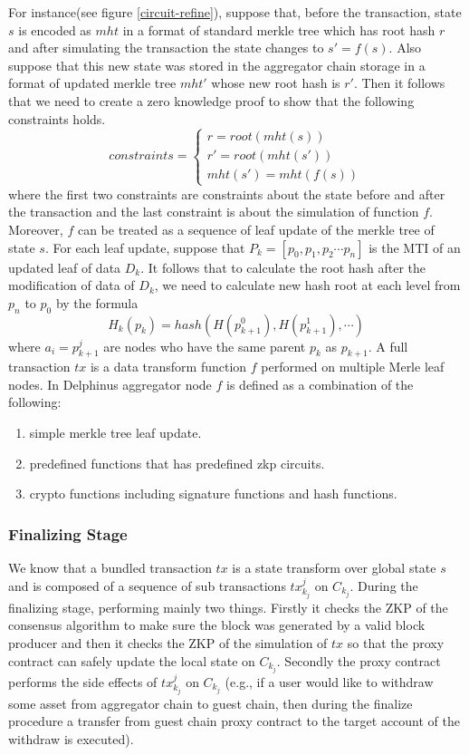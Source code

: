 \documentclass[acmtog, natbib=false]{acmart}
\begin{document}
For instance(see figure \ref{circuit-refine}), suppose that, before the transaction, state $s$ is encoded as $mht$ in a format of standard merkle tree which has root hash $r$ and after simulating the transaction the state changes to $s' = f(s)$. Also suppose that this new state was stored in the aggregator chain storage in a format of updated merkle tree $mht'$ whose new root hash is $r'$.
Then it follows that we need to create a zero knowledge proof to show that the following constraints holds.
$$ constraints = \begin{cases}
    r = root(mht(s)) \\
    r' = root(mht(s'))\\
    mht(s') = mht(f(s))
\end{cases} $$
where the first two constraints are constraints about the state before and after the transaction and the last constraint is about the simulation of function $f$.\\
\newline
Moreover, $f$ can be treated as a sequence of leaf update of the merkle tree of state $s$. For each leaf update, suppose that $P_k = [p_0, p_1, p_2 \cdots p_n]$ is the MTI of an updated leaf of data $D_k$. It follows that to calculate the root hash after the modification of data of $D_k$, we need to calculate new hash root at each level from $p_n$ to $p_0$ by the formula
$$
    H_k(p_k) = hash(H(p_{k+1}^0), H(p_{k+1}^1),\cdots) 
$$
where $a_i = p_{k+1}^{j}$ are nodes who have the same parent $p_k$ as $p_{k+1}$\cite{liskov2005updatable}. A full transaction $tx$ is a data transform function $f$ performed on multiple Merle leaf nodes. In Delphinus aggregator node $f$ is defined as a combination of the following:

\begin{enumerate}[leftmargin=*]
\item simple merkle tree leaf update.

\item predefined functions that has predefined zkp circuits.

\item crypto functions including signature functions and hash functions.
\end{enumerate}

\subsubsection{Finalizing Stage}
We know that a bundled transaction $tx$ is a state transform over global state $s$ and is composed of a sequence of sub transactions $tx^j_{k_j}$ on $C_{k_j}$. During the finalizing stage, \dprotocol performing mainly two things. Firstly it checks the ZKP of the consensus algorithm to make sure the block was generated by a valid block producer and then it checks the ZKP of the simulation of $tx$ so that the proxy contract can safely update the local state on $C_{k_j}$. Secondly the proxy contract performs the side effects of $tx^j_{k_j}$ on $C_{k_j}$ (e.g., if a user would like to withdraw some asset from aggregator chain to guest chain, then during the finalize procedure a transfer from guest chain proxy contract to the target account of the withdraw is executed).
\end{document}
